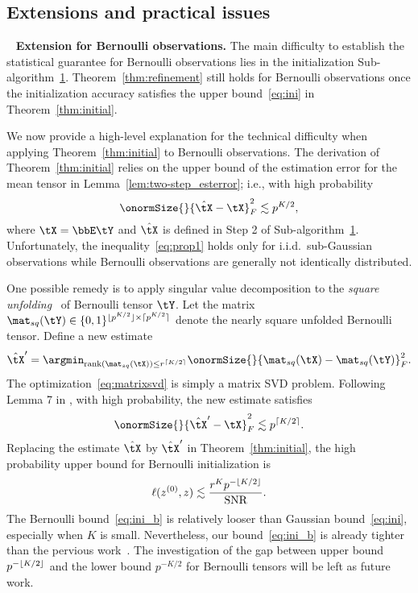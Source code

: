 \documentclass[lettersize,onecolumn,journal]{IEEEtran}
\theoremstyle{definition}
\theoremstyle{definition}
\DeclarePairedDelimiter{\ceil}{\lceil}{\rceil}
\DeclarePairedDelimiter{\floor}{\lfloor}{\rfloor}
\begin{document}
\subsection{Extensions and practical issues}~\label{subsec:exten}
\hspace{-.3cm} {\bf Extension for Bernoulli observations.} The main difficulty to establish the statistical guarantee for Bernoulli observations lies in the initialization Sub-algorithm~\hyperref[alg:main]{1}. Theorem~\ref{thm:refinement} still holds for Bernoulli observations once the initialization accuracy satisfies the upper bound~\eqref{eq:ini} in Theorem~\ref{thm:initial}.

We now provide a high-level explanation for the technical difficulty when applying Theorem~\ref{thm:initial} to Bernoulli observations. The derivation of Theorem~\ref{thm:initial} relies on the upper bound of the estimation error for the mean tensor in Lemma~\ref{lem:two-step_esterror}; i.e., with high probability
\begin{equation}\label{eq:prop1}
    \onormSize{}{\hat \tX - \tX}_F^2 \lesssim p^{K/2},
\end{equation}
where $\tX = \bbE\tY$ and $\hat \tX$ is defined in Step 2 of Sub-algorithm~\hyperref[alg:main]{1}. Unfortunately, the inequality~\eqref{eq:prop1} holds only for i.i.d.\ sub-Gaussian observations while Bernoulli observations are generally not identically distributed.  

One possible remedy is to apply singular value decomposition to the \emph{square unfolding}~\citep{mu2014square} of Bernoulli tensor $\tY$. Let the matrix $\mat_{sq} (\tY) \in \{0,1\}^{\floor{p^{K/2}} \times \ceil{p^{K/2}} }$ denote the nearly square unfolded Bernoulli tensor. Define a new estimate 
\begin{equation}\label{eq:matrixsvd}
    \hat \tX' = \argmin_{\text{rank}(\mat_{sq}(\tX)) \leq r^{\ceil{K/2}}} \onormSize{}{ \mat_{sq}(\tX) -  \mat_{sq}(\tY)}_F^2.
\end{equation}
The optimization~\eqref{eq:matrixsvd} is simply a matrix SVD problem. Following Lemma 7 in \cite{gao2018community}, with high probability, the new estimate satisfies
\begin{equation}
    \onormSize{}{\hat \tX' - \tX}_F^2 \lesssim p^{\ceil{K/2}}.
\end{equation} 
Replacing the estimate $\hat \tX$ by $\hat \tX'$ in Theorem~\ref{thm:initial}, the high probability upper bound for Bernoulli initialization is
\begin{equation}\label{eq:ini_b}
    \ell(z^{(0)}, z) \lesssim \frac{r^K p^{- \floor{K/2} }}{\text{SNR}}. 
\end{equation}
The Bernoulli bound~\eqref{eq:ini_b} is relatively looser than Gaussian bound~\eqref{eq:ini}, especially when $K$ is small. Nevertheless, our bound~\eqref{eq:ini_b} is already tighter than the pervious work~\citep{ke2019community}. The investigation of the gap between upper bound $p^{- \floor{K/2}}$ and the lower bound $p^{- K/2}$ for Bernoulli tensors will be left as future work. 
\end{document}
